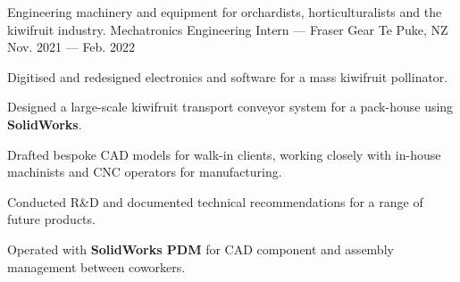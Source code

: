 \cventry%
    {Engineering machinery and equipment for orchardists, horticulturalists and the kiwifruit industry.}
    {Mechatronics Engineering Intern \textnormal{--- Fraser Gear}}
    {Te Puke, NZ}
    {Nov. 2021 --- Feb. 2022}
    {
      \begin{cvitems}
        \item {Digitised and redesigned electronics and software for a mass kiwifruit pollinator.}
        \item {Designed a large-scale kiwifruit transport conveyor system for a pack-house using \textbf{SolidWorks}.}
        \item {Drafted bespoke CAD models for walk-in clients, working closely with in-house machinists and CNC operators for manufacturing.}
        \item {Conducted R\&D and documented technical recommendations for a range of future products.}
        \item {Operated with \textbf{SolidWorks PDM} for CAD component and assembly management between coworkers.}
      \end{cvitems}
    }
